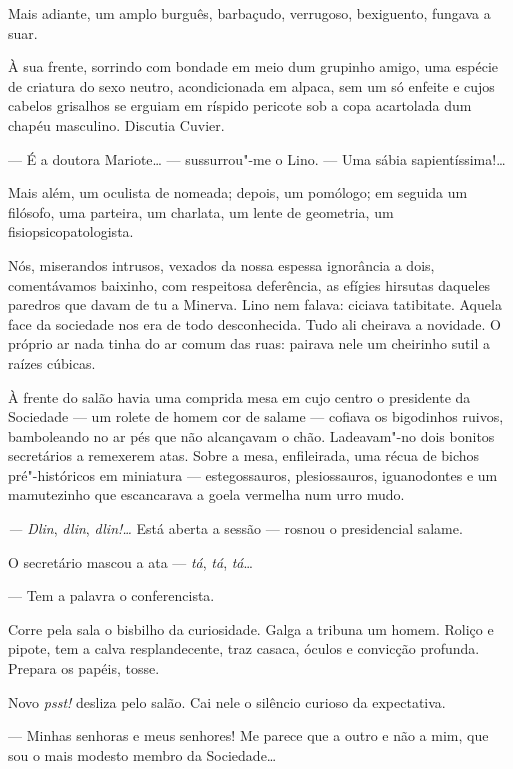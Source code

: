 Mais adiante, um amplo burguês, barbaçudo, verrugoso, bexiguento,
fungava a suar.

À sua frente, sorrindo com bondade em meio dum grupinho amigo, uma
espécie de criatura do sexo neutro, acondicionada em alpaca, sem um só
enfeite e cujos cabelos grisalhos se erguiam em ríspido pericote sob a
copa acartolada dum chapéu masculino. Discutia Cuvier.

--- É a doutora Mariote\ldots{} --- sussurrou"-me o Lino. --- Uma sábia
sapientíssima!\ldots{}

Mais além, um oculista de nomeada; depois, um pomólogo; em seguida um
filósofo, uma parteira, um charlata, um lente de geometria, um
fisiopsicopatologista.

Nós, miserandos intrusos, vexados da nossa espessa ignorância a dois,
comentávamos baixinho, com respeitosa deferência, as efígies hirsutas
daqueles paredros que davam de tu a Minerva. Lino nem falava: ciciava
tatibitate. Aquela face da sociedade nos era de todo desconhecida. Tudo
ali cheirava a novidade. O próprio ar nada tinha do ar comum das ruas:
pairava nele um cheirinho sutil a raízes cúbicas.

À frente do salão havia uma comprida mesa em cujo centro o presidente da
Sociedade --- um rolete de homem cor de salame --- cofiava os bigodinhos
ruivos, bamboleando no ar pés que não alcançavam o chão. Ladeavam"-no
dois bonitos secretários a remexerem atas. Sobre a mesa, enfileirada,
uma récua de bichos pré"-históricos em miniatura --- estegossauros,
plesiossauros, iguanodontes e um mamutezinho que escancarava a goela
vermelha num urro mudo.

\emph{--- Dlin}, \emph{dlin}, \emph{dlin!\ldots{}} Está aberta a sessão ---
rosnou o presidencial salame.

O secretário mascou a ata --- \emph{tá}, \emph{tá}, \emph{tá}\ldots{}

--- Tem a palavra o conferencista.

Corre pela sala o bisbilho da curiosidade. Galga a tribuna um homem.
Roliço e pipote, tem a calva resplandecente, traz casaca, óculos e
convicção profunda. Prepara os papéis, tosse.

Novo \emph{psst!} desliza pelo salão. Cai nele o silêncio curioso da
expectativa.

--- Minhas senhoras e meus senhores! Me parece que a outro e não a mim,
que sou o mais modesto membro da Sociedade\ldots{}

